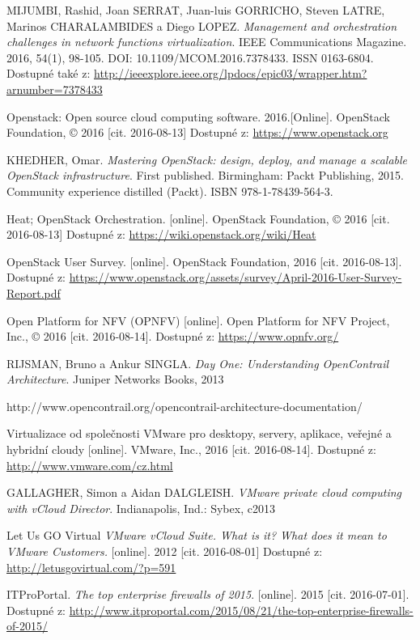\begin{thebibliography}{10}
MIJUMBI, Rashid, Joan SERRAT, Juan-luis GORRICHO, Steven LATRE, Marinos CHARALAMBIDES a Diego LOPEZ. \emph{Management and orchestration challenges in network functions virtualization}. IEEE Communications Magazine. 2016, 54(1), 98-105. DOI: 10.1109/MCOM.2016.7378433. ISSN 0163-6804. Dostupné také z: \url{http://ieeexplore.ieee.org/lpdocs/epic03/wrapper.htm?arnumber=7378433}

 Openstack:  Open  source  cloud  computing  software.  2016.[Online]. OpenStack Foundation, © 2016 [cit. 2016-08-13] Dostupné z: \url{https://www.openstack.org}

 KHEDHER, Omar. \emph{Mastering OpenStack: design, deploy, and manage a scalable OpenStack infrastructure}. First published. Birmingham: Packt Publishing, 2015. Community experience distilled (Packt). ISBN 978-1-78439-564-3.

Heat; OpenStack Orchestration. [online]. OpenStack Foundation, © 2016 [cit. 2016-08-13] Dostupné z: \url{https://wiki.openstack.org/wiki/Heat}

 OpenStack User Survey. [online]. OpenStack Foundation, 2016 [cit. 2016-08-13]. Dostupné z: \url{https://www.openstack.org/assets/survey/April-2016-User-Survey-Report.pdf}

 Open Platform for NFV (OPNFV) [online]. Open Platform for NFV Project, Inc., © 2016 [cit. 2016-08-14]. Dostupné z: \url{https://www.opnfv.org/}

 RIJSMAN, Bruno a Ankur SINGLA. \emph{Day One: Understanding OpenContrail Architecture}. Juniper Networks Books, 2013

 http://www.opencontrail.org/opencontrail-architecture-documentation/

 Virtualizace od společnosti VMware pro desktopy, servery, aplikace, veřejné a hybridní cloudy [online]. VMware, Inc., 2016 [cit. 2016-08-14]. Dostupné z: \url{http://www.vmware.com/cz.html}

GALLAGHER, Simon a Aidan DALGLEISH. \emph{VMware private cloud computing with vCloud Director}. Indianapolis, Ind.: Sybex, c2013

 Let Us GO Virtual \emph{VMware vCloud Suite. What is it? What does it mean to VMware Customers.} [online]. 2012 [cit. 2016-08-01] Dostupné z: \url{http://letusgovirtual.com/?p=591}

 ITProPortal. \emph{The top enterprise firewalls of 2015}. [online]. 2015 [cit. 2016-07-01]. Dostupné z: \url{http://www.itproportal.com/2015/08/21/the-top-enterprise-firewalls-of-2015/}


\end{thebibliography}
